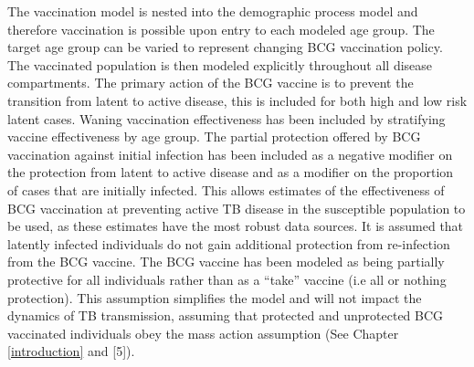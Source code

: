 \documentclass[11pt,twoside]{bristolthesis}
\begin{document}
  The vaccination model is nested into the demographic process model and therefore vaccination is possible upon entry to each modeled age group. The target age group can be varied to represent changing BCG vaccination policy. The vaccinated population is then modeled explicitly throughout all disease compartments. The primary action of the BCG vaccine is to prevent the transition from latent to active disease, this is included for both high and low risk latent cases. Waning vaccination effectiveness has been included by stratifying vaccine effectiveness by age group. The partial protection offered by BCG vaccination against initial infection has been included as a negative modifier on the protection from latent to active disease and as a modifier on the proportion of cases that are initially infected. This allows estimates of the effectiveness of BCG vaccination at preventing active TB disease in the susceptible population to be used, as these estimates have the most robust data sources. It is assumed that latently infected individuals do not gain additional protection from re-infection from the BCG vaccine. The BCG vaccine has been modeled as being partially protective for all individuals rather than as a ``take'' vaccine (i.e all or nothing protection). This assumption simplifies the model and will not impact the dynamics of TB transmission, assuming that protected and unprotected BCG vaccinated individuals obey the mass action assumption (See Chapter \ref{introduction} and {[}5{]}).
\end{document}
